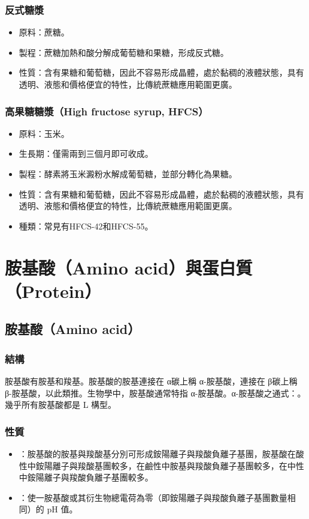 \documentclass[a4paper,12pt]{report}
\begin{document}
\begin{itemize}
\begin{itemize}
\subsubsection{反式糖漿}
\begin{itemize}
\item 原料：蔗糖。
\item 製程：蔗糖加熱和酸分解成葡萄糖和果糖，形成反式糖。
\item 性質：含有果糖和葡萄糖，因此不容易形成晶體，處於黏稠的液體狀態，具有透明、液態和價格便宜的特性，比傳統蔗糖應用範圍更廣。
\end{itemize}
\subsubsection{高果糖糖漿（High fructose syrup, HFCS）}
\begin{itemize}
\item 原料：玉米。
\item 生長期：僅需兩到三個月即可收成。
\item 製程：酵素將玉米澱粉水解成葡萄糖，並部分轉化為果糖。
\item 性質：含有果糖和葡萄糖，因此不容易形成晶體，處於黏稠的液體狀態，具有透明、液態和價格便宜的特性，比傳統蔗糖應用範圍更廣。
\item 種類：常見有HFCS-42和HFCS-55。
\end{itemize}


\section{胺基酸（Amino acid）與蛋白質（Protein）}
\subsection{胺基酸（Amino acid）}
\subsubsection{結構}
胺基酸有胺基和羧基。胺基酸的胺基連接在 α碳上稱 α-胺基酸，連接在 β碳上稱 β-胺基酸，以此類推。生物學中，胺基酸通常特指 α-胺基酸。α-胺基酸之通式：。幾乎所有胺基酸都是 L 構型。
\subsubsection{性質}
\begin{itemize}
\item {}：胺基酸的胺基與羧酸基分別可形成銨陽離子與羧酸負離子基團，胺基酸在酸性中銨陽離子與羧酸基團較多，在鹼性中胺基與羧酸負離子基團較多，在中性中銨陽離子與羧酸負離子基團較多。
\item {}：使一胺基酸或其衍生物總電荷為零（即銨陽離子與羧酸負離子基團數量相同）的 pH 值。
\end{itemize}

\end{itemize}
\end{itemize}
\end{document}
